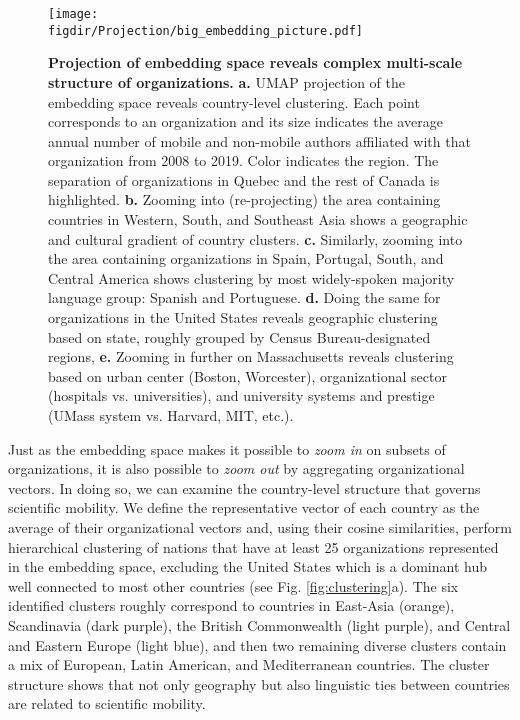 \documentclass[12pt]{article} %
\def\figdir{../Figs}
\begin{document}
%
%
\begin{figure}[hp!]
	\centering
	\texttt{[image: \\figdir/Projection/big\_embedding\_picture.pdf]}
	\caption{
		\textbf{Projection of embedding space reveals complex multi-scale structure of organizations.}
		\textbf{a.}
		UMAP projection \autocite{mcinnes2018umap} of the embedding space reveals country-level clustering.
		Each point corresponds to an organization and its size indicates the average annual number of mobile and non-mobile authors affiliated with that organization from 2008 to 2019.
		Color indicates the region.
		The separation of organizations in Quebec and the rest of Canada is highlighted.
		\textbf{b.} Zooming into (re-projecting) the area containing countries in Western, South, and Southeast Asia shows a geographic and cultural gradient of country clusters.
		\textbf{c.} Similarly, zooming into the area containing organizations in Spain, Portugal, South, and Central America shows clustering by most widely-spoken majority language group: Spanish and Portuguese.
		\textbf{d.} Doing the same for organizations in the United States reveals geographic clustering based on state, roughly grouped by Census Bureau-designated regions,
		\textbf{e.} Zooming in further on Massachusetts reveals clustering based on urban center (Boston, Worcester), organizational sector (hospitals vs. universities), and university systems and prestige (UMass system vs. Harvard, MIT, etc.).
	}
	\label{fig:projection}
\end{figure}


Just as the embedding space makes it possible to \textit{zoom in} on subsets of organizations, it is also possible to \textit{zoom out} by aggregating organizational vectors.
In doing so, we can examine the country-level structure that governs scientific mobility.
We define the representative vector of each country as the average of their organizational vectors and, using their cosine similarities, perform hierarchical clustering of nations that have at least 25 organizations represented in the embedding space, excluding the United States which is a dominant hub well connected to most other countries (see Fig. \ref{fig:clustering}a).
The six identified clusters roughly correspond to countries in East-Asia (orange), Scandinavia (dark purple), the British Commonwealth (light purple), and Central and Eastern Europe (light blue), and then two remaining diverse clusters contain a mix of European, Latin American, and Mediterranean countries.
The cluster structure shows that not only geography but also linguistic ties between countries are related to scientific mobility.
\end{document}
